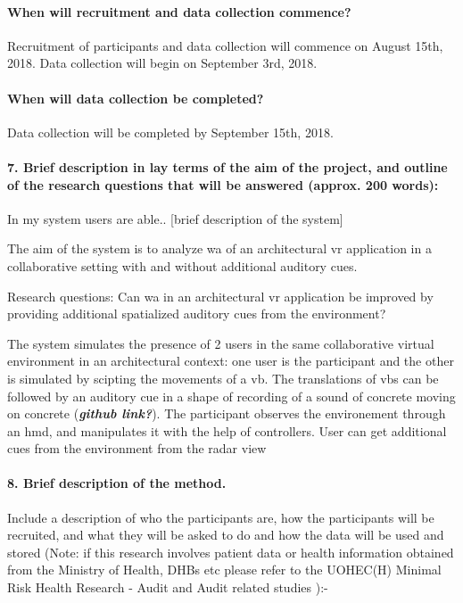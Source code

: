 \paragraph{When will recruitment and data collection commence?}


Recruitment of participants and data collection will commence on August 15th, 2018. Data collection will begin on September 3rd, 2018.
\paragraph{When will data collection be completed?}


Data collection will be completed by September 15th, 2018.
\paragraph{7.	Brief description in lay terms of the aim of the project, and outline of the research questions that will be answered (approx. 200 words):}


In my system users are able.. [brief description of the system]

The aim of the system is to analyze \gls{wa} of an architectural \gls{vr} application in a collaborative setting with and without additional auditory cues. \newline

Research questions: Can \gls{wa} in an architectural \gls{vr} application be improved by providing additional spatialized auditory cues from the environment? \newline

The system simulates the presence of 2 users in the same collaborative virtual environment in an architectural context: one user is the participant and the other is simulated by scipting the movements of a \gls{vb}. The translations of \gls{vb}s can be followed by an auditory cue in a shape of recording of a sound of concrete moving on concrete (\textbf{\textit{github link?}}). The participant observes the environement through an \gls{hmd}, and manipulates it with the help of controllers. User can get additional cues from the environment from the radar view

\paragraph{8.	Brief description of the method.} Include a description of who the participants are, how the participants will be recruited, and what they will be asked to do and how the data will be used and stored (Note: if this research involves patient data or health information obtained from the Ministry of Health, DHBs etc please refer to the UOHEC(H) Minimal Risk Health Research  - Audit and Audit related studies ):-

